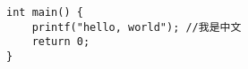 \documentclass{article}
\begin{document}
\begin{verbatim}
int main() {
    printf("hello, world"); //我是中文
    return 0;
}
\end{verbatim}
\end{document}

